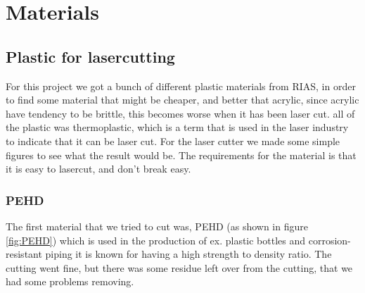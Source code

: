 \section{Materials}
\subsection{Plastic for lasercutting}
For this project we got a bunch of different plastic materials from RIAS, in order to find some material that might be cheaper, and better that acrylic, since acrylic have tendency to be brittle, this becomes worse when it has been laser cut.
all of the plastic was thermoplastic, which is a term that is used in the laser industry to indicate that it can be laser cut.
For the laser cutter we made some simple figures to see what the result would be.
The requirements for the material is that it is easy to lasercut, and don't break easy.

\subsubsection{PEHD}
The first material that we tried to cut was, PEHD (as shown in figure \ref{fig:PEHD}) which is used in the production of ex. plastic bottles and corrosion-resistant piping it is known for having a high strength to density ratio.
The cutting went fine, but there was some residue left over from the cutting, that we had some problems removing.

